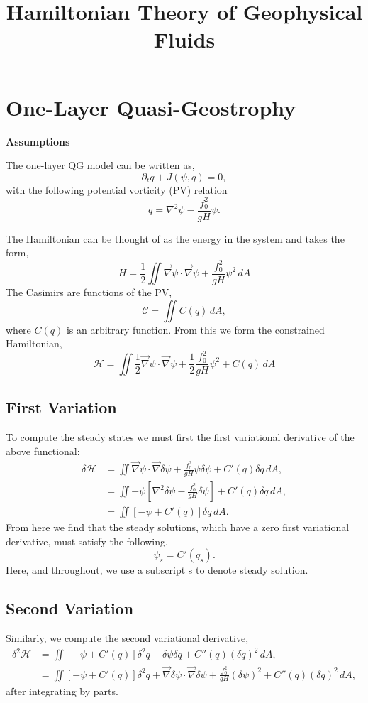 \documentclass[12pt]{article}
\begin{document}
\title{Hamiltonian Theory of Geophysical Fluids}

\section{One-Layer Quasi-Geostrophy}
  \textbf{Assumptions}

  The one-layer QG model can be written as,
  $$
  \partial_t q + J(\psi, q) = 0,
  $$
  with the following potential vorticity (PV) relation
  $$
  q = \nabla^2 \psi - \frac{f_0^2}{gH} \psi.
  $$
  
  The Hamiltonian can be thought of as the energy in the system and takes the form,
  $$
  H =  \frac12 \iint \vec\nabla\psi \cdot \vec\nabla\psi + \frac{f_0^2}{g H} \psi^2 \, dA
  $$
  The Casimirs are functions of the PV,
  $$
  \mathcal{C} = \iint C(q) \, dA,
  $$
  where $C(q)$ is an arbitrary function. From this we form the constrained Hamiltonian,
  \begin{equation}
    \mathcal{H} = \iint  \frac12 \vec\nabla\psi \cdot \vec\nabla\psi + \frac12 \frac{f_0^2}{g H} \psi^2 + C(q) \, dA
    \label{eqn:qg_ol_h}
  \end{equation}

  \subsection{First Variation}
    To compute the steady states we must first the first variational derivative of the above functional:
    \begin{align*}
    \delta \mathcal{H} 
    & = \iint \vec\nabla\psi \cdot \vec\nabla \delta \psi + \frac{f_0^2}{g H} \psi \delta \psi + C'(q) \delta q \, dA, \\
    & = \iint -\psi \left[ \nabla^2 \delta \psi - \frac{f_0^2}{g H} \delta \psi \right]  + C'(q) \delta q \, dA, \\
    & = \iint \left[ - \psi + C'(q) \right]  \delta q  \, dA.
    \end{align*}
    From here we find that the steady solutions, which have a zero first variational derivative, must satisfy the following,
    $$
    \psi_s = C'(q_s).
    $$
    Here, and throughout, we use a subscript s to denote steady solution.
  
  \subsection{Second Variation}
    Similarly, we compute the second variational derivative,
    \begin{align*}
    \delta^2 \mathcal{H} 
    & = \iint \left[ - \psi + C'(q) \right]  \delta^2 q  - \delta \psi \delta q +  C''(q) (\delta q)^2  \, dA, \\
    & = \iint \left[ - \psi + C'(q) \right]  \delta^2 q   
    + \vec\nabla \delta \psi \cdot \vec \nabla \delta \psi 
    +\frac{f_0^2}{gH} (\delta \psi)^2+  C''(q) (\delta q)^2  \, dA, 
    \end{align*}
    after integrating by parts.
    
\end{document}
